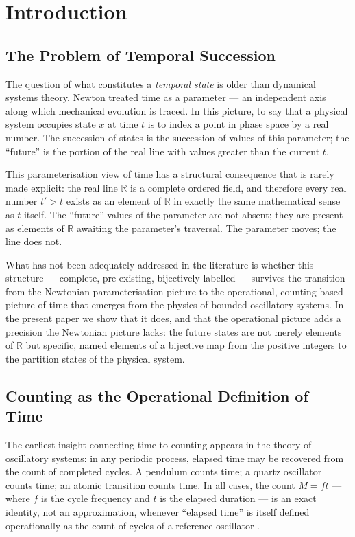 \documentclass[twocolumn,10pt,a4paper]{article}
\theoremstyle{thmstyle}
\theoremstyle{definition}
\theoremstyle{remark}
\newcommand{\R}{\mathbb{R}}
\begin{document}
\section{Introduction}
\label{sec:introduction}

\subsection{The Problem of Temporal Succession}

The question of what constitutes a \emph{temporal state} is older than dynamical systems theory. Newton treated time as a parameter --- an independent axis along which mechanical evolution is traced. In this picture, to say that a physical system occupies state $x$ at time $t$ is to index a point in phase space by a real number. The succession of states is the succession of values of this parameter; the ``future'' is the portion of the real line with values greater than the current $t$.

This parameterisation view of time has a structural consequence that is rarely made explicit: the real line $\R$ is a complete ordered field, and therefore every real number $t' > t$ exists as an element of $\R$ in exactly the same mathematical sense as $t$ itself. The ``future'' values of the parameter are not absent; they are present as elements of $\R$ awaiting the parameter's traversal. The parameter moves; the line does not.

What has not been adequately addressed in the literature is whether this structure --- complete, pre-existing, bijectively labelled --- survives the transition from the Newtonian parameterisation picture to the operational, counting-based picture of time that emerges from the physics of bounded oscillatory systems. In the present paper we show that it does, and that the operational picture adds a precision the Newtonian picture lacks: the future states are not merely elements of $\R$ but specific, named elements of a bijective map from the positive integers to the partition states of the physical system.

\subsection{Counting as the Operational Definition of Time}

The earliest insight connecting time to counting appears in the theory of oscillatory systems: in any periodic process, elapsed time may be recovered from the count of completed cycles. A pendulum counts time; a quartz oscillator counts time; an atomic transition counts time. In all cases, the count $M = ft$ --- where $f$ is the cycle frequency and $t$ is the elapsed duration --- is an exact identity, not an approximation, whenever ``elapsed time'' is itself defined operationally as the count of cycles of a reference oscillator \citep{planck1900,birkhoff1931,landau1976}.
\end{document}
